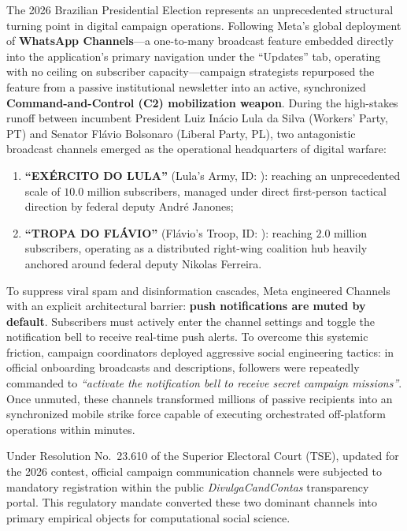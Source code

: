 \documentclass[preprint,12pt]{elsarticle}
\begin{document}
The 2026 Brazilian Presidential Election represents an unprecedented structural turning point in digital campaign operations. Following Meta's global deployment of \textbf{WhatsApp Channels}---a one-to-many broadcast feature embedded directly into the application's primary navigation under the ``Updates'' tab, operating with no ceiling on subscriber capacity---campaign strategists repurposed the feature from a passive institutional newsletter into an active, synchronized \textbf{Command-and-Control (C2) mobilization weapon}. During the high-stakes runoff between incumbent President Luiz Inácio Lula da Silva (Workers' Party, PT) and Senator Flávio Bolsonaro (Liberal Party, PL), two antagonistic broadcast channels emerged as the operational headquarters of digital warfare:
\begin{enumerate}
    \item \textbf{``EXÉRCITO DO LULA''} (Lula's Army, ID: ): reaching an unprecedented scale of $10.0\text{ million}$ subscribers, managed under direct first-person tactical direction by federal deputy André Janones;
    \item \textbf{``TROPA DO FLÁVIO''} (Flávio's Troop, ID: ): reaching $2.0\text{ million}$ subscribers, operating as a distributed right-wing coalition hub heavily anchored around federal deputy Nikolas Ferreira.
\end{enumerate}

To suppress viral spam and disinformation cascades, Meta engineered Channels with an explicit architectural barrier: \textbf{push notifications are muted by default}. Subscribers must actively enter the channel settings and toggle the notification bell to receive real-time push alerts. To overcome this systemic friction, campaign coordinators deployed aggressive social engineering tactics: in official onboarding broadcasts and descriptions, followers were repeatedly commanded to \textit{``activate the notification bell to receive secret campaign missions''}. Once unmuted, these channels transformed millions of passive recipients into an synchronized mobile strike force capable of executing orchestrated off-platform operations within minutes.

Under Resolution No.\ 23.610 of the Superior Electoral Court (TSE), updated for the 2026 contest, official campaign communication channels were subjected to mandatory registration within the public \textit{DivulgaCandContas} transparency portal. This regulatory mandate converted these two dominant channels into primary empirical objects for computational social science.
\end{document}
